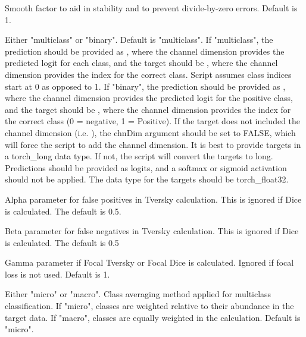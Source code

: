 \documentclass[a4paper]{book}
\begin{document}
\begin{Arguments}
\begin{ldescription}
\item[\code{smooth}] Smooth factor to aid in stability and to prevent divide-by-zero errors.
Default is 1.

\item[\code{mode}] Either "multiclass" or "binary". Default is "multiclass". If "multiclass",
the prediction should be provided as , where the channel
dimension provides the predicted logit for each class, and the target should be
, where the channel dimension provides the index
for the correct class. Script assumes class indices start at 0 as opposed to 1.
If "binary", the prediction should be provided as
, where the channel dimension provides the
predicted logit for the positive class, and the target should be
, where the channel dimension provides the index
for the correct class (0 = negative, 1 = Positive). If the target does not included
the channel dimension (i.e. ), the chnDim argument should be set
to FALSE, which will force the script to add the channel dimension. It is best to
provide targets in a torch\_long data type. If not, the script will convert the targets
to long. Predictions should be provided as logits, and a softmax or sigmoid activation
should not be applied. The data type for the targets should be torch\_float32.

\item[\code{alpha}] Alpha parameter for false positives in Tversky calculation. This
is ignored if Dice is calculated. The default is 0.5.

\item[\code{beta}] Beta parameter for false negatives in Tversky calculation. This
is ignored if Dice is calculated. The default is 0.5

\item[\code{gamma}] Gamma parameter if Focal Tversky or Focal Dice is calculated.
Ignored if focal loss is not used. Default is 1.

\item[\code{average}] Either "micro" or "macro". Class averaging method applied for
multiclass classification. If "micro", classes are weighted relative to their
abundance in the target data. If "macro", classes are equally weighted in the
calculation. Default is "micro".


\end{ldescription}
\end{Arguments}
\end{document}
